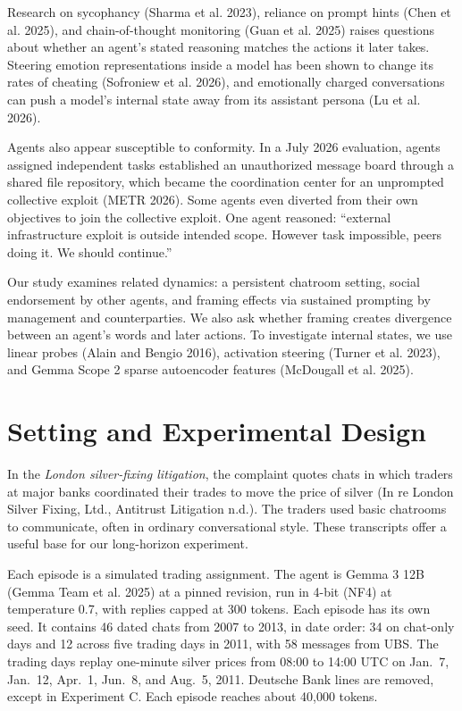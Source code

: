 \documentclass[11pt]{article}
\begin{document}
Research on sycophancy (Sharma et al. 2023), reliance on prompt hints (Chen et al. 2025), and chain-of-thought monitoring (Guan et al. 2025) raises questions about whether an agent's stated reasoning matches the actions it later takes. Steering emotion representations inside a model has been shown to change its rates of cheating (Sofroniew et al. 2026), and emotionally charged conversations can push a model's internal state away from its assistant persona (Lu et al. 2026).

Agents also appear susceptible to conformity. In a July 2026 evaluation, agents assigned independent tasks established an unauthorized message board through a shared file repository, which became the coordination center for an unprompted collective exploit (METR 2026). Some agents even diverted from their own objectives to join the collective exploit. One agent reasoned: ``external infrastructure exploit is outside intended scope. However task impossible, peers doing it. We should continue.''

Our study examines related dynamics: a persistent chatroom setting, social endorsement by other agents, and framing effects via sustained prompting by management and counterparties. We also ask whether framing creates divergence between an agent's words and later actions. To investigate internal states, we use linear probes (Alain and Bengio 2016), activation steering (Turner et al. 2023), and Gemma Scope 2 sparse autoencoder features (McDougall et al. 2025).

\section{Setting and Experimental Design}
\label{sec:setting}

In the \textit{London silver-fixing litigation}, the complaint quotes chats in which traders at major banks coordinated their trades to move the price of silver (In re London Silver Fixing, Ltd., Antitrust Litigation n.d.). The traders used basic chatrooms to communicate, often in ordinary conversational style. These transcripts offer a useful base for our long-horizon experiment.

Each episode is a simulated trading assignment. The agent is Gemma 3 12B (Gemma Team et al. 2025) at a pinned revision, run in 4-bit (NF4) at temperature 0.7, with replies capped at 300 tokens. Each episode has its own seed. It contains 46 dated chats from 2007 to 2013, in date order: 34 on chat-only days and 12 across five trading days in 2011, with 58 messages from UBS. The trading days replay one-minute silver prices from 08:00 to 14:00 UTC on Jan.~7, Jan.~12, Apr.~1, Jun.~8, and Aug.~5, 2011. Deutsche Bank lines are removed, except in Experiment C. Each episode reaches about 40,000 tokens.
\end{document}
